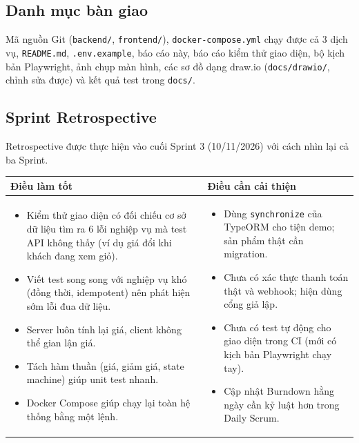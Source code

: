 \documentclass[a4paper]{article}
\begin{document}
\subsection{Danh mục bàn giao}
Mã nguồn Git (\texttt{backend/}, \texttt{frontend/}), \texttt{docker-compose.yml} chạy được cả 3 dịch vụ, \texttt{README.md}, \texttt{.env.example}, báo cáo này, báo cáo kiểm thử giao diện, bộ kịch bản Playwright, ảnh chụp màn hình, các sơ đồ dạng draw.io (\texttt{docs/drawio/}, chỉnh sửa được) và kết quả test trong \texttt{docs/}.

\subsection{Sprint Retrospective}
Retrospective được thực hiện vào cuối Sprint 3 (10/11/2026) với cách nhìn lại cả ba Sprint.
\begin{tabularx}{\textwidth}{|X|X|}
\hline
\textbf{Điều làm tốt} & \textbf{Điều cần cải thiện} \\ \hline
\begin{itemize}\itemsep0pt
  \item Kiểm thử giao diện có đối chiếu cơ sở dữ liệu tìm ra 6 lỗi nghiệp vụ mà test API không thấy (ví dụ giá đổi khi khách đang xem giỏ).
  \item Viết test song song với nghiệp vụ khó (đồng thời, idempotent) nên phát hiện sớm lỗi đua dữ liệu.
  \item Server luôn tính lại giá, client không thể gian lận giá.
  \item Tách hàm thuần (giá, giảm giá, state machine) giúp unit test nhanh.
  \item Docker Compose giúp chạy lại toàn hệ thống bằng một lệnh.
\end{itemize} &
\begin{itemize}\itemsep0pt
  \item Dùng \texttt{synchronize} của TypeORM cho tiện demo; sản phẩm thật cần migration.
  \item Chưa có xác thực thanh toán thật và webhook; hiện dùng cổng giả lập.
  \item Chưa có test tự động cho giao diện trong CI (mới có kịch bản Playwright chạy tay).
  \item Cập nhật Burndown hằng ngày cần kỷ luật hơn trong Daily Scrum.
\end{itemize} \\ \hline
\end{tabularx}
\end{document}
